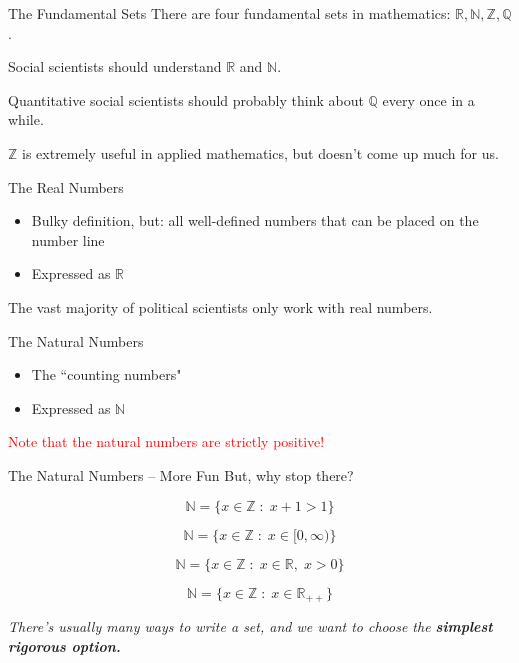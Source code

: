 \documentclass[10pt]{beamer}
\begin{document}
\begin{frame}{The Fundamental Sets}
    There are four fundamental sets in mathematics: $\mathbb{R}, \mathbb{N}, \mathbb{Z}, \mathbb{Q}$.

    Social scientists should understand $\mathbb{R}$ and $\mathbb{N}$.

    Quantitative social scientists should probably think about $\mathbb{Q}$ every once in a while.

    $\mathbb{Z}$ is extremely useful in applied mathematics, but doesn't come up much for us.
\end{frame}

\begin{frame}{The Real Numbers}
\begin{itemize}
\item Bulky definition, but: all well-defined numbers that can be placed on the number line \\

\item Expressed as $\mathbb{R}$ \\
\end{itemize}

The vast majority of political scientists only work with real numbers.
\end{frame}

\begin{frame}{The Natural Numbers}
    \begin{itemize}
        \item The ``counting numbers"

        \item Expressed as $\mathbb{N}$

    \end{itemize}
\textcolor{red}{Note that the natural numbers are strictly positive!}
\end{frame}

\begin{frame}{The Natural Numbers -- More Fun}
    But, why stop there?

    \[\mathbb{N} = \{x \in \mathbb{Z} \; : \; x + 1 > 1\}\]

    \[\mathbb{N} = \{x \in \mathbb{Z} \; : \; x \in [0,\infty)\}\]

    \[\mathbb{N} = \{x \in \mathbb{Z} \; : \; x \in \mathbb{R},\; x>0\}\]

    \[\mathbb{N} = \{x \in \mathbb{Z} \; : \; x \in \mathbb{R}_{++}\}\]

    \textit{There's usually many ways to write a set, and we want to choose the \textbf{simplest rigorous option.}}

\end{frame}
\end{document}
